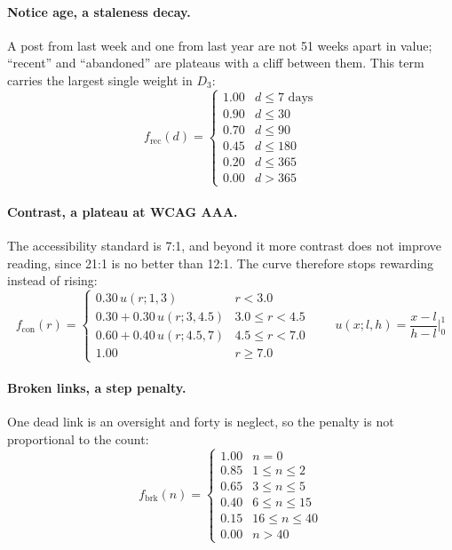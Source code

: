 \documentclass[11pt,a4paper]{article}
\begin{document}
\paragraph{Notice age, a staleness decay.} A post from last week and one from last year are not 51
weeks apart in value; ``recent'' and ``abandoned'' are plateaus with a cliff between them. This term
carries the largest single weight in $D_3$:
\begin{equation}
f_{\text{rec}}(d) = \begin{cases}
1.00 & d \le 7 \text{ days}\\ 0.90 & d \le 30\\ 0.70 & d \le 90\\
0.45 & d \le 180\\ 0.20 & d \le 365\\ 0.00 & d > 365
\end{cases}
\label{eq:rec}
\end{equation}

\paragraph{Contrast, a plateau at WCAG AAA.} The accessibility standard is 7:1, and beyond it more
contrast does not improve reading, since 21:1 is no better than 12:1. The curve therefore stops
rewarding instead of rising:
\begin{equation}
f_{\text{con}}(r) = \begin{cases}
0.30\,u(r;1,3) & r < 3.0\\
0.30 + 0.30\,u(r;3,4.5) & 3.0 \le r < 4.5\\
0.60 + 0.40\,u(r;4.5,7) & 4.5 \le r < 7.0\\
1.00 & r \ge 7.0
\end{cases}
\qquad u(x;l,h) = \frac{x-l}{h-l}\bigg|_0^1
\label{eq:con}
\end{equation}

\paragraph{Broken links, a step penalty.} One dead link is an oversight and forty is neglect, so the
penalty is not proportional to the count:
\begin{equation}
f_{\text{brk}}(n) = \begin{cases}
1.00 & n = 0\\ 0.85 & 1 \le n \le 2\\ 0.65 & 3 \le n \le 5\\
0.40 & 6 \le n \le 15\\ 0.15 & 16 \le n \le 40\\ 0.00 & n > 40
\end{cases}
\label{eq:brk}
\end{equation}
\end{document}
